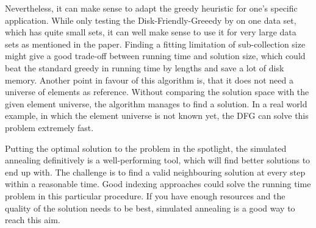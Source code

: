 \documentclass[a4paper]{article}
\begin{document}
Nevertheless, it can make sense to adapt the greedy heuristic for one's specific application. While only testing the Disk-Friendly-Greeedy by \citeauthor{Cormode} on one data set, which has quite small sets, it can well make sense to use it for very large data sets as mentioned in the paper. Finding a fitting limitation of sub-collection size might give a good trade-off between running time and solution size, which could beat the standard greedy in running time by lengths and save a lot of disk memory. Another point in favour of this algorithm is, that it does not need a universe of elements as reference. Without comparing the solution space with the given element universe, the algorithm manages to find a solution. In a real world example, in which the element universe is not known yet, the DFG can solve this problem extremely fast. 

Putting the optimal solution to the problem in the spotlight, the simulated annealing definitively is a well-performing tool, which will find better solutions to end up with. The challenge is to find a valid neighbouring solution at every step within a reasonable time. Good indexing approaches could solve the running time problem in this particular procedure. If you have enough resources and the quality of the solution needs to be best, simulated annealing is a good way to reach this aim.




%

\end{document}
